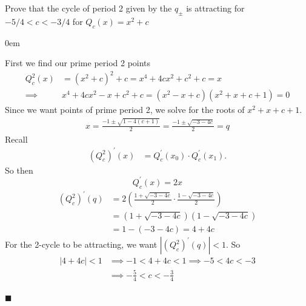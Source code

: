 \documentclass[12pt]{article}
\renewcommand{\qed}{\hfill$\blacksquare$}
\renewenvironment{proof}{\vspace{1em}\begin{addmargin}[2em]{0em}\begin{newproof}}{\end{newproof}\end{addmargin}\qed}
\newenvironment{exercise}[2][Exercise]{\begin{trivlist}
\item[\hskip \labelsep {\bfseries #1} \hskip \labelsep {\bfseries #2.}]}{\end{trivlist}}
\begin{document}
\begin{exercise}{3}
	Prove that the cycle of period 2 given by the $q_{\pm}$ is attracting for $-5/4 < c < -3/4$ for $Q_c(x) = x^2 + c$
\end{exercise}
\begin{proof} First we find our prime period 2 points
	\begin{align*}
		Q_c^{2}(x) &= (x^2 + c)^2 + c = x^4 + 4cx^2 + c^2 + c = x \\
		\implies& x^4 + 4cx^2 - x + c^2 + c = (x^2 - x + c)(x^2 + x + c + 1) = 0 
	\end{align*}
	Since we want points of prime period 2, we solve for the roots of $x^2 + x + c + 1$.
	\begin{align*}
		x = \frac{-1 \pm \sqrt{1 - 4(c+1)}}{2} = \frac{-1 \pm \sqrt{-3-4c}}{2} = q
	\end{align*}
	Recall
	\begin{align*}
		(Q_c^{2})^{'}(x) &= Q_c^{'}(x_0)\cdot Q_c^{'}(x_1).
	\end{align*}
	So then
	\[
		Q_c^{'}(x) = 2x
	\]
	\begin{align*}
		(Q_c^{2})^{'}(q) &= 2\left(\frac{1 + \sqrt{-3 -4c}}{2}\cdot\frac{1 - \sqrt{-3 - 4c}}{2}\right) \\
				 &= (1 + \sqrt{-3 - 4c})(1 - \sqrt{-3 -4c}) \\
				 &= 1 - (-3 - 4c) = 4 + 4c
	\end{align*}
	For the 2-cycle to be attracting, we want $|(Q_c^2)^{'}(q)| < 1$. So
	\begin{align*}
		|4 + 4c| < 1 &\implies -1 < 4 + 4c < 1 \implies -5 < 4c < -3 \\
			     &\implies -\frac{5}{4} < c < -\frac{3}{4}
	\end{align*}
\end{proof}
\end{document}
